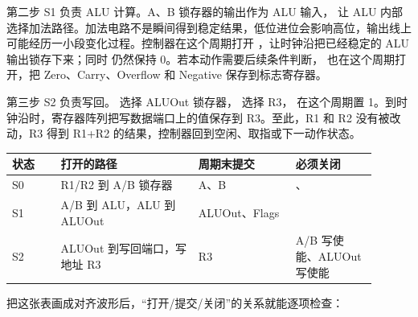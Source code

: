 第二步 S1 负责 ALU 计算。A、B 锁存器的输出作为 ALU 输入， 让 ALU 内部选择加法路径。加法电路不是瞬间得到稳定结果，低位进位会影响高位，输出线上可能经历一小段变化过程。控制器在这个周期打开 ，让时钟沿把已经稳定的 ALU 输出锁存下来；同时  仍然保持 0。若本动作需要后续条件判断， 也在这个周期打开，把 Zero、Carry、Overflow 和 Negative 保存到标志寄存器。

第三步 S2 负责写回。 选择 ALUOut 锁存器， 选择 R3， 在这个周期置 1。到时钟沿时，寄存器阵列把写数据端口上的值保存到 R3。至此，R1 和 R2 没有被改动，R3 得到 R1+R2 的结果，控制器回到空闲、取指或下一动作状态。

\begin{longtable}{L{0.12\linewidth}L{0.34\linewidth}L{0.24\linewidth}L{0.2\linewidth}}
\toprule
状态 & 打开的路径 & 周期末提交 & 必须关闭 \\
\midrule
S0 & R1/R2 到 A/B 锁存器 & A、B & 、 \\
S1 & A/B 到 ALU，ALU 到 ALUOut & ALUOut、Flags &  \\
S2 & ALUOut 到写回端口，写地址 R3 & R3 & A/B 写使能、ALUOut 写使能 \\
\bottomrule
\end{longtable}

把这张表画成对齐波形后，“打开/提交/关闭”的关系就能逐项检查：

